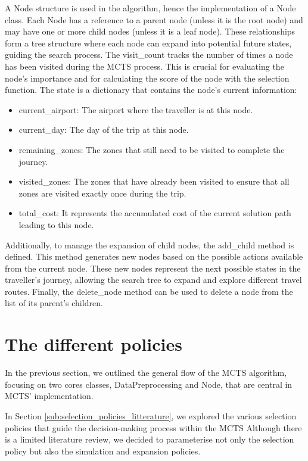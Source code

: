 \documentclass[conference]{IEEEtran}
\begin{document}
A Node structure is used in the algorithm, hence the implementation of a Node class. 
Each Node has a reference to a parent node (unless it is the root node) and may have one or more child nodes (unless it is a leaf node). These relationships form a tree structure where each node can expand into potential future states, guiding the search process. 
The visit\_count tracks the number of times a node has been visited during the MCTS process. This is crucial for evaluating the node's importance and for calculating the score of the node with the selection function. 
The state is a dictionary that contains the node's current information:
\begin{itemize}
    \item current\_airport: The airport where the traveller is  at this node.
    \item current\_day: The day of the trip at this node.
    \item remaining\_zones: The zones that still need to be visited to complete the journey.
    \item visited\_zones: The zones that have already been visited to ensure that all zones are visited exactly once during the trip.
    \item total\_cost: It represents the accumulated cost of the current solution path leading to this node.
\end{itemize}

Additionally, to manage the expansion of child nodes, the add\_child method is defined. 
This method generates new nodes based on the possible actions available from the current node. These new nodes represent the next possible states in the traveller’s journey, allowing the search tree to expand and explore different travel routes. 
Finally, the delete\_node method can be used to delete a node from the list of its parent's children. 



\section{The different policies}

In the previous section, we outlined the general flow of the MCTS algorithm, focusing on two cores classes, DataPreprocessing and Node, that are central in MCTS' implementation.

In Section \ref{sub:selection_policies_litterature}, we explored the various selection policies that guide the decision-making process within the MCTS
Although there is a limited literature review, we decided to parameterise not only the selection policy but also the simulation and expansion policies.
\end{document}

